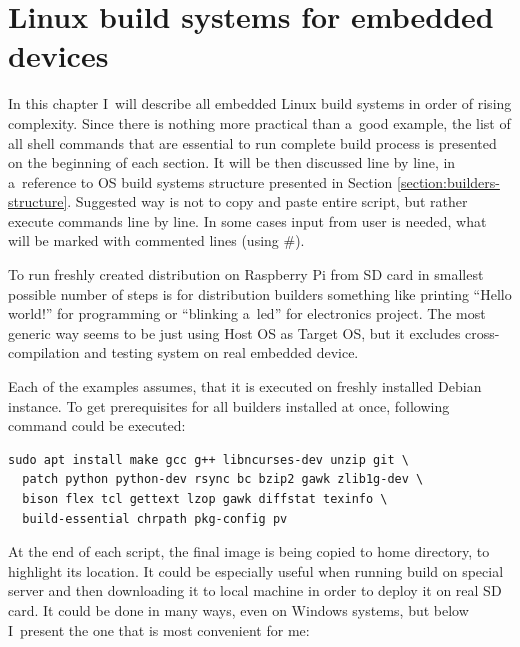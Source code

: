 \documentclass[printmode]{mgr}
\begin{document}
\chapter{Linux build systems for embedded devices}
\label{chapter:build-systems}






In this chapter I~will describe all embedded Linux build systems in order of rising complexity.
Since there is nothing more practical than a~good example, the list of all shell commands that are essential to run complete build process is presented on the beginning of each section.
It will be then discussed line by line, in a~reference to OS build systems structure presented in Section \ref{section:builders-structure}.
Suggested way is not to copy and paste entire script, but rather execute commands line by line.
In some cases input from user is needed, what will be marked with commented lines (using \#).

To run freshly created distribution on Raspberry Pi from SD card in smallest possible number of steps is for distribution builders something like printing ``Hello world!'' for programming or ``blinking a~led'' for electronics project.
The most generic way seems to be just using Host OS as Target OS, but it excludes cross-compilation and testing system on real embedded device.

Each of the examples assumes, that it is executed on freshly installed Debian instance.
To get prerequisites for all builders installed at once, following command could be executed:


\begin{lstlisting}
sudo apt install make gcc g++ libncurses-dev unzip git \
  patch python python-dev rsync bc bzip2 gawk zlib1g-dev \ 
  bison flex tcl gettext lzop gawk diffstat texinfo \
  build-essential chrpath pkg-config pv
\end{lstlisting}

At the end of each script, the final image is being copied to home directory, to highlight its location.
It could be especially useful when running build on special server and then downloading it to local machine in order to deploy it on real SD card.
It could be done in many ways, even on Windows systems, but below I~present the one that is most convenient for me:
\end{document}

